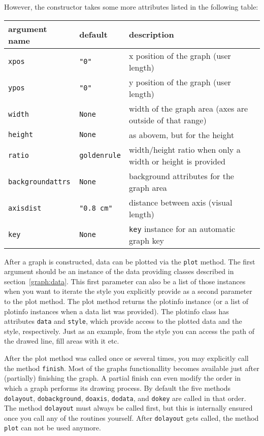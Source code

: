 However, the constructor takes some more attributes listed in the
following table:

\medskip
\begin{tabularx}{\linewidth}{ll>{\raggedright\arraybackslash}X}
argument name&default&description\\
\hline
\texttt{xpos}&\texttt{"0"}&x position of the graph (user length)\\
\texttt{ypos}&\texttt{"0"}&y position of the graph (user length)\\
\texttt{width}&\texttt{None}&width of the graph area (axes are outside of that range)\\
\texttt{height}&\texttt{None}&as abovem, but for the height\\
\texttt{ratio}&\texttt{goldenrule}&width/height ratio when only a width or height is provided\\
\texttt{backgroundattrs}&\texttt{None}&background attributes for the graph area\\
\texttt{axisdist}&\texttt{"0.8 cm"}&distance between axis (visual length)\\
\texttt{key}&\texttt{None}&\texttt{key} instance for an automatic graph key\\
\end{tabularx}
\medskip

After a graph is constructed, data can be plotted via the \verb|plot|
method. The first argument should be an instance of the data providing
classes described in section~\ref{graph:data}. This first parameter
can also be a list of those instances when you want to iterate the
style you explicitly provide as a second parameter to the plot method.
The plot method returns the plotinfo instance (or a list of plotinfo
instances when a data list was provided). The plotinfo class has
attributes \verb|data| and \verb|style|, which provide access to the
plotted data and the style, respectively. Just as an example, from the
style you can access the path of the drawed line, fill areas with it
etc.

After the plot method was called once or several times, you may
explicitly call the method \verb|finish|. Most of the graphs
functionallity becomes available just after (partially) finishing the
graph. A partial finish can even modify the order in which a graph
performs its drawing process. By default the five methods
\verb|dolayout|, \verb|dobackground|, \verb|doaxis|, \verb|dodata|,
and \verb|dokey| are called in that order. The method \verb|dolayout|
must always be called first, but this is internally ensured once you
call any of the routines yourself. After \verb|dolayout| gets called,
the method \verb|plot| can not be used anymore.


